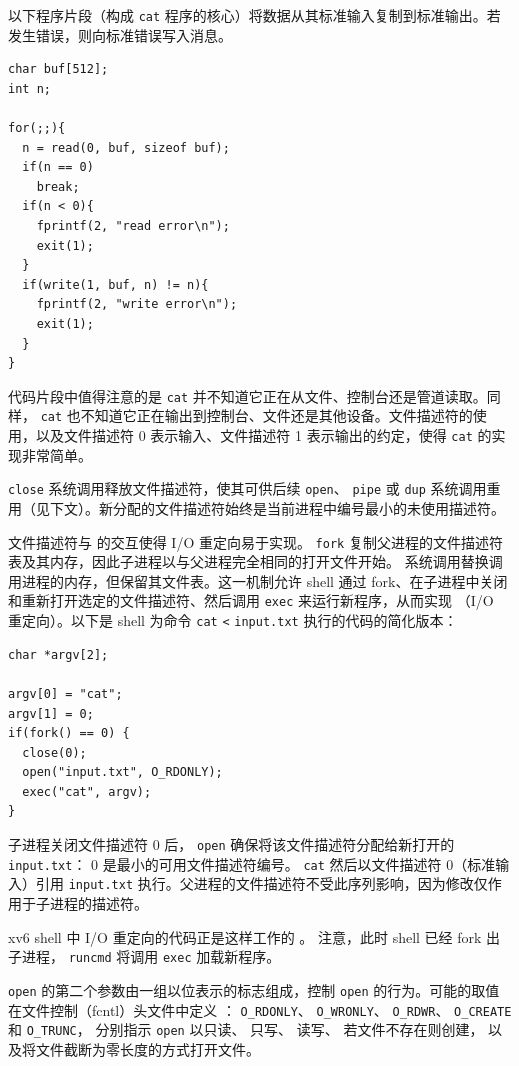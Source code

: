 以下程序片段（构成 \lstinline{cat} 程序的核心）将数据从其标准输入复制到标准输出。若发生错误，则向标准错误写入消息。
\begin{lstlisting}[]
char buf[512];
int n;

for(;;){
  n = read(0, buf, sizeof buf);
  if(n == 0)
    break;
  if(n < 0){
    fprintf(2, "read error\n");
    exit(1);
  }
  if(write(1, buf, n) != n){
    fprintf(2, "write error\n");
    exit(1);
  }
}
\end{lstlisting}
代码片段中值得注意的是
\lstinline{cat}
并不知道它正在从文件、控制台还是管道读取。同样，
\lstinline{cat}
也不知道它正在输出到控制台、文件还是其他设备。文件描述符的使用，以及文件描述符 0 表示输入、文件描述符 1 表示输出的约定，使得
\lstinline{cat}
的实现非常简单。

\lstinline{close}
系统调用释放文件描述符，使其可供后续
\lstinline{open}、
\lstinline{pipe}
或
\lstinline{dup}
系统调用重用（见下文）。新分配的文件描述符始终是当前进程中编号最小的未使用描述符。

文件描述符与
的交互使得 I/O 重定向易于实现。
\lstinline{fork}
复制父进程的文件描述符表及其内存，因此子进程以与父进程完全相同的打开文件开始。
系统调用替换调用进程的内存，但保留其文件表。这一机制允许 shell 通过 fork、在子进程中关闭和重新打开选定的文件描述符、然后调用 \lstinline{exec} 来运行新程序，从而实现 （I/O 重定向）。以下是 shell 为命令
\lstinline{cat}
\lstinline{<}
\lstinline{input.txt}
执行的代码的简化版本：
\begin{lstlisting}[]
char *argv[2];

argv[0] = "cat";
argv[1] = 0;
if(fork() == 0) {
  close(0);
  open("input.txt", O_RDONLY);
  exec("cat", argv);
}
\end{lstlisting}
子进程关闭文件描述符 0 后，
\lstinline{open}
确保将该文件描述符分配给新打开的
\lstinline{input.txt}：
0 是最小的可用文件描述符编号。
\lstinline{cat}
然后以文件描述符 0（标准输入）引用
\lstinline{input.txt}
执行。父进程的文件描述符不受此序列影响，因为修改仅作用于子进程的描述符。

xv6 shell 中 I/O 重定向的代码正是这样工作的
。
注意，此时 shell 已经 fork 出子进程，
\lstinline{runcmd}
将调用
\lstinline{exec}
加载新程序。

\lstinline{open}
的第二个参数由一组以位表示的标志组成，控制 \lstinline{open} 的行为。可能的取值在文件控制（fcntl）头文件中定义
：
\lstinline{O_RDONLY}、
\lstinline{O_WRONLY}、
\lstinline{O_RDWR}、
\lstinline{O_CREATE}
和
\lstinline{O_TRUNC}，
分别指示 \lstinline{open}
以只读、
只写、
读写、
若文件不存在则创建，
以及将文件截断为零长度的方式打开文件。

